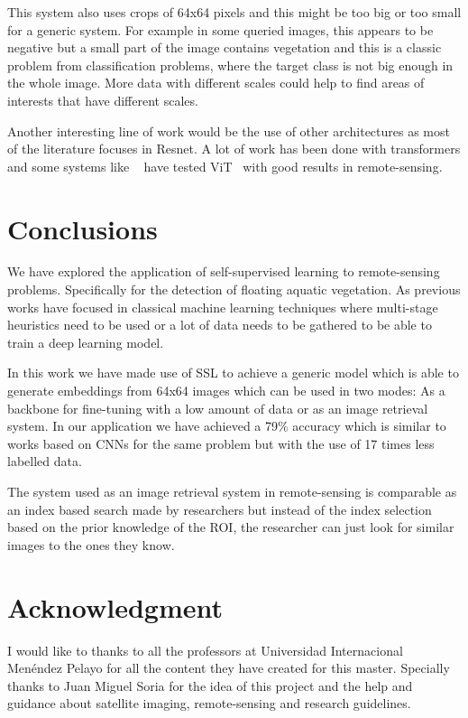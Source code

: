 \documentclass[conference]{IEEEtran}
\begin{document}
    This system also uses crops of 64x64 pixels and this might be too big or too small for a generic system.
    For example in some queried images, this appears to be negative but a small part of the image contains vegetation and this is a classic problem from classification problems,
    where the target class is not big enough in the whole image.
    More data with different scales could help to find areas of interests that have different scales.

    Another interesting line of work would be the use of other architectures as most of the literature focuses in Resnet.
    A lot of work has been done with transformers and some systems like ~\citet{wang2023ssl4eos12, li2022efficient} have tested ViT~\cite{dosovitskiy2021image} with good results in remote-sensing.


    \section{Conclusions}

    We have explored the application of self-supervised learning to remote-sensing problems.
    Specifically for the detection of floating aquatic vegetation.
    As previous works have focused in classical machine learning techniques where multi-stage heuristics need to be used or a lot of data needs
    to be gathered to be able to train a deep learning model.

    In this work we have made use of SSL to achieve a generic model which is able to generate embeddings from 64x64 images which can be used in two modes:
    As a backbone for fine-tuning with a low amount of data or as an image retrieval system.
    In our application we have achieved a 79\% accuracy which is similar to works based on CNNs for the same problem but with the use of 17 times less labelled data.

    The system used as an image retrieval system in remote-sensing is comparable as an index based search made by researchers but instead of the index selection based
    on the prior knowledge of the ROI, the researcher can just look for similar images to the ones they know.

    \section*{Acknowledgment}
    I would like to thanks to all the professors at Universidad Internacional Menéndez Pelayo for all the content they have created for this master.
    Specially thanks to Juan Miguel Soria for the idea of this project and the help and guidance about satellite imaging, remote-sensing and research guidelines.
\end{document}
